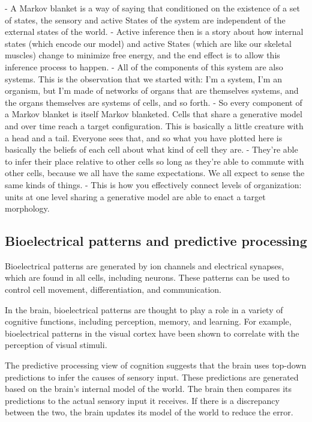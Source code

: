 - A Markov blanket is a way of saying that conditioned on the existence of a set of states, the sensory and active States of the system are independent of the external states of the world.
- Active inference then is a story about how internal states (which encode our model) and active States (which are like our skeletal muscles) change to minimize free energy, and the end effect is to allow this inference process to happen.
- All of the components of this system are also systems. This is the observation that we started with: I'm a system, I'm an organism, but I'm made of networks of organs that are themselves systems, and the organs themselves are systems of cells, and so forth.
- So every component of a Markov blanket is itself Markov blanketed. Cells that share a generative model and over time reach a target configuration. This is basically a little creature with a head and a tail. Everyone sees that, and so what you have plotted here is basically the beliefs of each cell about what kind of cell they are.
- They're able to infer their place relative to other cells so long as they're able to commute with other cells, because we all have the same expectations. We all expect to sense the same kinds of things.
- This is how you effectively connect levels of organization: units at one level sharing a generative model are able to enact a target morphology.

\subsection{Bioelectrical patterns and predictive processing} 

Bioelectrical patterns are generated by ion channels and electrical synapses, which are found in all cells, including neurons. These patterns can be used to control cell movement, differentiation, and communication.

In the brain, bioelectrical patterns are thought to play a role in a variety of cognitive functions, including perception, memory, and learning. For example, bioelectrical patterns in the visual cortex have been shown to correlate with the perception of visual stimuli.

The predictive processing view of cognition suggests that the brain uses top-down predictions to infer the causes of sensory input. These predictions are generated based on the brain's internal model of the world. The brain then compares its predictions to the actual sensory input it receives. If there is a discrepancy between the two, the brain updates its model of the world to reduce the error.

